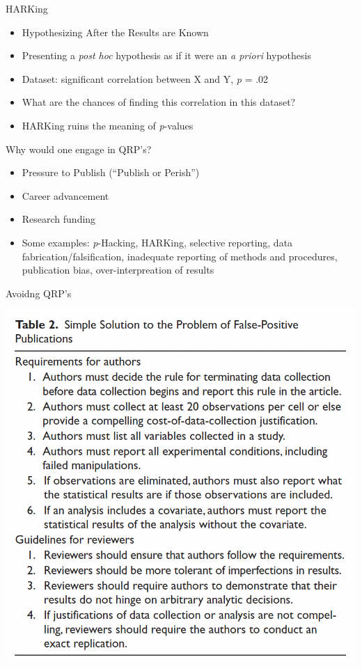 \documentclass[
  ignorenonframetext,
  aspectratio=169,
]{beamer}
\providecommand{\tightlist}{%
  \setlength{\itemsep}{0pt}\setlength{\parskip}{0pt}}\usepackage{longtable,booktabs,array}
\begin{document}
\begin{frame}{HARKing}
\label{harking}
\begin{itemize}[<+->]
\tightlist
\item
  Hypothesizing After the Results are Known
\item
  Presenting a \emph{post hoc} hypothesis as if it were an \emph{a
  priori} hypothesis
\item
  Dataset: significant correlation between X and Y, \emph{p} = .02
\item
  What are the chances of finding this correlation in this dataset?
\item
  HARKing ruins the meaning of \emph{p}-values
\end{itemize}
\end{frame}

\begin{frame}{Why would one engage in QRP's?}
\label{why-would-one-engage-in-qrps}
\begin{itemize}[<+->]
\tightlist
\item
  Pressure to Publish (``Publish or Perish'')
\item
  Career advancement
\item
  Research funding
\item
  Some examples: \emph{p}-Hacking, HARKing, selective reporting, data
  fabrication/falsification, inadequate reporting of methods and
  procedures, publication bias, over-interpreation of results
\end{itemize}
\end{frame}

\begin{frame}{Avoidng QRP's}
\label{avoidng-qrps}
\begin{center}
\includegraphics{figs/avoid-qrp.png}
\end{center}
\end{frame}
\end{document}
